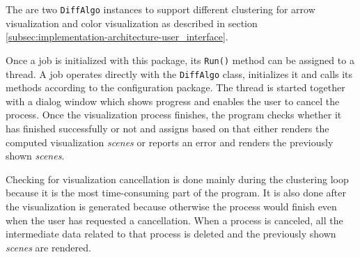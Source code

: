 The are two \verb+DiffAlgo+ instances to support different clustering for arrow visualization and color visualization as described in section \ref{subsec:implementation-architecture-user_interface}.

Once a job is initialized with this package, its \verb+Run()+ method can be assigned to a thread. A job operates directly with the \verb+DiffAlgo+ class, initializes it and calls its methods according to the configuration package. The thread is started together with a dialog window which shows progress and enables the user to cancel the process. Once the visualization process finishes, the program checks whether it has finished successfully or not and assigns based on that either renders the computed visualization {\it scenes} or reports an error and renders the previously shown {\it scenes}.

Checking for visualization cancellation is done mainly during the clustering loop because it is the most time-consuming part of the program. It is also done after the visualization is generated because otherwise the process would finish even when the user has requested a cancellation. When a process is canceled, all the intermediate data related to that process is deleted and the previously shown {\it scenes} are rendered.
